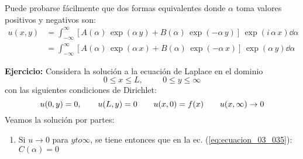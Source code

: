 Puede probarse fácilmente que dos formas equivalentes donde $\alpha$ toma valores positivos y negativos son:
\begin{align*}
u(x, y) &= \int_{-\infty}^{\infty} \left[ A(\alpha) \, \exp(\alpha \, y) + B(\alpha) \, \exp(-\alpha \, y) \right] \, \exp(i \, \alpha \, x) \dd{\alpha} \\[1em]
&= \int_{-\infty}^{\infty} \left[ A(\alpha) \, \exp(\alpha \, x) + B(\alpha) \, \exp(-\alpha \, x) \right] \, \exp(\alpha \, y) \dd{\alpha}
\end{align*}
\par
\textbf{Ejercicio:} Considera la solución a la ecuación de Laplace en el dominio
\[ 0 \leq x \leq L, \hspace{1cm} 0 \leq y \leq \infty \]
con las siguientes condiciones de Dirichlet:
\[ u(0, y) = 0, \hspace{0.7cm} u(L, y) = 0 \hspace{0.7cm} u(x, 0) = f(x) \hspace{0.7cm} u(x, \infty) \to 0 \]
Veamos la solución por partes:
\begin{enumerate}
\item Si $u \to 0$ para $y to \infty$, se tiene entonces que en la ec. (\ref{eq:ecuacion_03_035}): $C(\alpha) = 0$

\end{enumerate}
